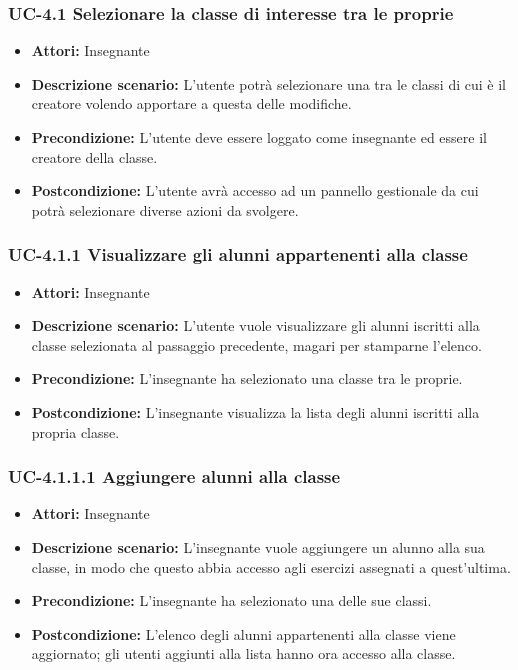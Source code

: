 \subsubsection{UC-4.1 Selezionare la classe di interesse tra le proprie}
	\begin{itemize}
		\item \textbf{Attori: } Insegnante
		\item \textbf{Descrizione scenario: } L'utente potrà selezionare una tra le classi di cui è il creatore volendo apportare a questa delle modifiche.
		\item \textbf{Precondizione: } L'utente deve essere loggato come insegnante ed essere il creatore della classe. 
		\item \textbf{Postcondizione: } L'utente avrà accesso ad un pannello gestionale da cui potrà selezionare diverse azioni da svolgere.
	\end{itemize}
\subsubsection{UC-4.1.1 Visualizzare gli alunni appartenenti alla classe}
\begin{itemize}
		\item \textbf{Attori: } Insegnante
		\item \textbf{Descrizione scenario: } L'utente vuole visualizzare gli alunni iscritti alla classe selezionata al passaggio precedente, magari per stamparne l'elenco.
		\item \textbf{Precondizione: }  L'insegnante ha selezionato una classe tra le proprie.
		\item \textbf{Postcondizione: } L'insegnante visualizza la lista degli alunni iscritti alla propria classe.
	\end{itemize}
\subsubsection{UC-4.1.1.1 Aggiungere alunni alla classe}
\begin{itemize}
		\item \textbf{Attori: } Insegnante
		\item \textbf{Descrizione scenario: } L'insegnante vuole aggiungere un alunno alla sua classe, in modo che questo abbia accesso agli esercizi assegnati a quest'ultima.
		\item \textbf{Precondizione: } L'insegnante ha selezionato una delle sue classi.
		\item \textbf{Postcondizione: } L'elenco degli alunni appartenenti alla classe viene aggiornato; gli utenti aggiunti alla lista hanno ora accesso alla classe.
	\end{itemize}
